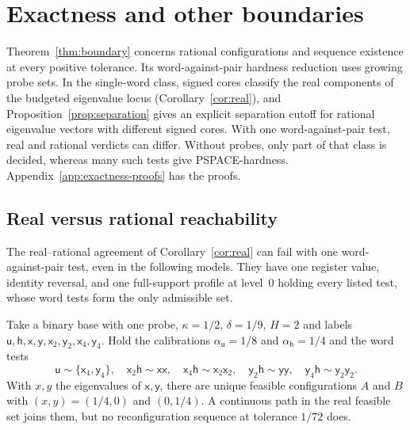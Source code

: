 
\section{Exactness and other boundaries}\label{sec:exactness}

Theorem~\ref{thm:boundary} concerns rational configurations and sequence
existence at every positive tolerance. Its word-against-pair hardness
reduction uses growing probe sets. In the single-word class, signed cores
classify the real components of the budgeted eigenvalue locus
(Corollary~\ref{cor:real}), and Proposition~\ref{prop:separation} gives an
explicit separation cutoff for rational eigenvalue vectors with different
signed cores. With one word-against-pair test, real and rational verdicts
can differ. Without probes, only part of that class is decided, whereas
many such tests give PSPACE-hardness. Appendix~\ref{app:exactness-proofs}
has the proofs.

\subsection{Real versus rational reachability}\label{sec:real-rational}

The real--rational agreement of Corollary~\ref{cor:real} can fail with one
word-against-pair test, even in the following models. They have one register value, identity reversal, and one full-support profile at level~$0$ holding every listed test, whose word tests form the only admissible set.

\begin{proposition}\label{prop:one-probe}
Take a binary base with one probe, $\kappa=1/2$, $\delta=1/9$, $H=2$ and
labels $\mathsf u,\mathsf h,\mathsf x,\mathsf y,\mathsf x_2,\mathsf
y_2,\mathsf x_4,\mathsf y_4$. Hold the calibrations $\alpha_{\mathsf
u}=1/8$ and $\alpha_{\mathsf h}=1/4$ and the word tests
\[
  \mathsf u\sim\{\mathsf x_4,\mathsf y_4\},\quad
  \mathsf x_2\mathsf h\sim\mathsf{xx},\quad
  \mathsf x_4\mathsf h\sim\mathsf x_2\mathsf x_2,\quad
  \mathsf y_2\mathsf h\sim\mathsf{yy},\quad
  \mathsf y_4\mathsf h\sim\mathsf y_2\mathsf y_2 .
\]
With $x,y$ the eigenvalues of $\mathsf x,\mathsf y$, there are unique
feasible configurations $A$ and $B$ with $(x,y)=(1/4,0)$ and $(0,1/4)$. A
continuous path in the real feasible set joins them, but no
reconfiguration sequence at tolerance $1/72$ does.
\end{proposition}

